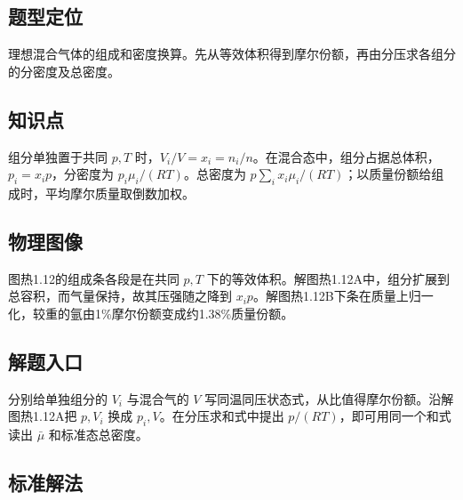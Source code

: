 \documentclass[UTF8,fontset=fandol,a4paper,11pt]{ctexart}
\begin{document}
\subsection*{题型定位}

理想混合气体的组成和密度换算。先从等效体积得到摩尔份额，再由分压求各组分的分密度及总密度。



\subsection*{知识点}

组分单独置于共同 $p,T$ 时，$V_i/V=x_i=n_i/n$。在混合态中，组分占据总体积，$p_i=x_i p$，分密度为 $p_i\mu_i/(RT)$。总密度为 $p\sum_i x_i\mu_i/(RT)$；以质量份额给组成时，平均摩尔质量取倒数加权。



\subsection*{物理图像}

图热1.12的组成条各段是在共同 $p,T$ 下的等效体积。解图热1.12A中，组分扩展到总容积，而气量保持，故其压强随之降到 $x_ip$。解图热1.12B下条在质量上归一化，较重的氩由1\%摩尔份额变成约1.38\%质量份额。



\subsection*{解题入口}

分别给单独组分的 $V_i$ 与混合气的 $V$ 写同温同压状态式，从比值得摩尔份额。沿解图热1.12A把 $p,V_i$ 换成 $p_i,V$。在分压求和式中提出 $p/(RT)$，即可用同一个和式读出 $\bar\mu$ 和标准态总密度。



\subsection*{标准解法}
\end{document}
